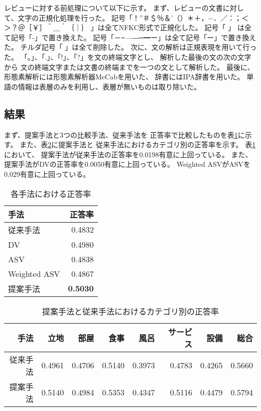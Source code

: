 レビューに対する前処理について以下に示す。
まず、レビューの文書に対して、文字の正規化処理を行った。
記号「！”＃＄％＆’（）＊＋，−．／：；＜＞？＠［￥］＾＿｀｛｜｝
」は全てNFKC形式で正規化した。
記号「
」
は全て記号「-」で置き換えた。
記号「－ｰ—―─━ー」は全て記号「ー」で置き換えた。
チルダ記号「
」は全て削除した。
次に、文の解析は正規表現を用いて行った。
「。」、「.」、「!」、「?」を文の終端文字とし、
解析した最後の文の次の文字から
文の終端文字または文書の終端までを一つの文として解析した。
最後に、形態素解析には形態素解析器MeCabを用いた、
辞書にはIPA辞書を用いた。
単語の情報は表層のみを利用し、表層が無いものは取り除いた。


\subsection{結果}

まず、提案手法と3つの比較手法、従来手法\cite{fujitani15}を
正答率で比較したものを表\ref{tab:Accuracies}に示す。
また、表\ref{tab:AccuraciesPerCategory}に提案手法と
従来手法\cite{fujitani15}におけるカテゴリ別の正答率を示す。
表\ref{tab:Accuracies}において、
提案手法が従来手法\cite{fujitani15}の正答率を0.0198有意に上回っている。
また、提案手法がDVの正答率を0.0050有意に上回っている。
Weighted ASVがASVを0.029有意に上回っている。

\begin{table}
  \caption{各手法における正答率}
  \centering
  \begin{tabular}{l | r} \label{tab:Accuracies}
    手法 & 正答率 \\
    \hline
    従来手法\cite{fujitani15} & 0.4832 \\
    DV & 0.4980 \\
    ASV & 0.4838 \\
    Weighted ASV & 0.4867 \\
    提案手法 & \textbf{0.5030} \\
  \end{tabular}
\end{table}

\begin{table}
  \caption{提案手法と従来手法\cite{fujitani15}におけるカテゴリ別の正答率}
  \centering
  \begin{tabular}{r | r r r r r r r} \label{tab:AccuraciesPerCategory}
    手法 & 立地 & 部屋 & 食事 & 風呂 & サービス & 設備 & 総合 \\
    \hline
    従来手法\cite{fujitani15}
        & 0.4961 & 0.4706 & 0.5140 & 0.3973 & 0.4783 & 0.4265 & 0.5660 \\
    提案手法 & 0.5140 & 0.4984 & 0.5353 & 0.4347 & 0.5116 & 0.4479 & 0.5794 \\
  \end{tabular}
\end{table}

